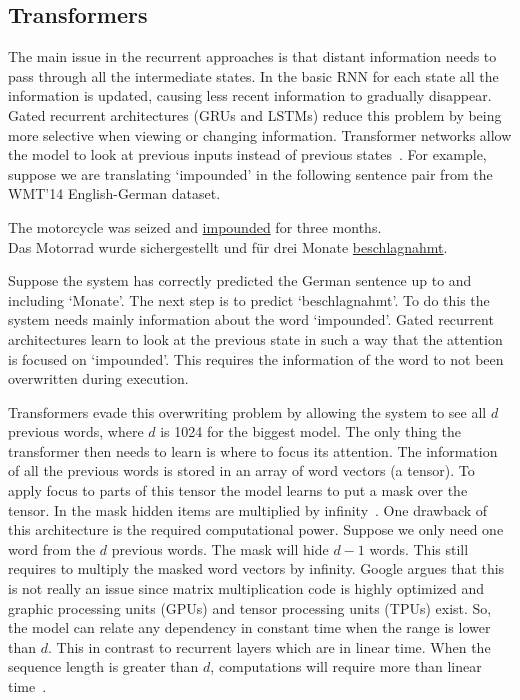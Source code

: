 \subsection{Transformers}
\label{subsec:transformers}
The main issue in the recurrent approaches is that distant information needs to pass through all the intermediate states.
In the basic RNN for each state all the information is updated, causing less recent information to gradually disappear.
Gated recurrent architectures (GRUs and LSTMs) reduce this problem by being more selective when viewing or changing information.
Transformer networks allow the model to look at previous inputs instead of previous states~\citep{vaswani2017attention}.
For example, suppose we are translating `impounded' in the following sentence pair from the WMT'14 English-German dataset.
\begin{center}
    The motorcycle was seized and \underline{impounded} for three months.\\[3mm]
    Das Motorrad wurde sichergestellt und f\"ur drei Monate \underline{beschlagnahmt}.
\end{center}
Suppose the system has correctly predicted the German sentence up to and including `Monate'.
The next step is to predict `beschlagnahmt'.
To do this the system needs mainly information about the word `impounded'.
Gated recurrent architectures learn to look at the previous state in such a way that the attention is focused on `impounded'.
This requires the information of the word to not been overwritten during execution.

Transformers evade this overwriting problem by allowing the system to see all $d$ previous words, where $d$ is 1024 for the biggest model.
The only thing the transformer then needs to learn is where to focus its attention.
The information of all the previous words is stored in an array of word vectors (a tensor).
To apply focus to parts of this tensor the model learns to put a mask over the tensor.
In the mask hidden items are multiplied by infinity~\citep{vaswani2017attention}.
One drawback of this architecture is the required computational power.
Suppose we only need one word from the $d$ previous words.
The mask will hide $d-1$ words.
This still requires to multiply the masked word vectors by infinity.
Google argues that this is not really an issue since matrix multiplication code is highly optimized and graphic processing units (GPUs) and tensor processing units (TPUs) exist.
So, the model can relate any dependency in constant time when the range is lower than $d$.
This in contrast to recurrent layers which are in linear time.
When the sequence length is greater than $d$, computations will require more than linear time~\citep{vaswani2017attention}.

